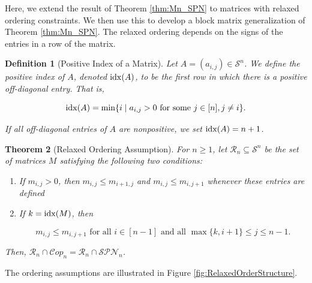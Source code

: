 \documentclass{amsart}
\def\idx{{\rm idx}}
\newcommand{\cR}{\mathcal{R}}
\newcommand{\cS}{\mathcal{S}}
\newcommand{\Cop}{\mathcal{C}op}
\newcommand{\SPN}{\mathcal{SPN}}
\newtheorem{theorem}{Theorem}[section]
\newtheorem{definition}[theorem]{Definition}
\theoremstyle{definition}
\begin{document}
Here, we extend the result of Theorem \ref{thm:Mn_SPN} to matrices with relaxed ordering constraints. We then use this to develop a block matrix generalization of Theorem \ref{thm:Mn_SPN}. The relaxed ordering depends on the signs of the entries in a row of the matrix. 

\begin{definition}[Positive Index of a Matrix]\label{def:idx}
Let $A = (a_{i,j}) \in \cS^n$. We define the positive index of $A$, denoted $\idx(A)$, to be the first row in which there is a positive off-diagonal entry. That is,  

\[\idx(A) = \min\{i\; \vert \; a_{i,j} > 0\text{ for some } j \in [n], j\neq i\}.\]

If all off-diagonal entries of $A$ are nonpositive, we set $\idx(A) = n+1$. 
\end{definition}

\begin{theorem}[Relaxed Ordering Assumption]\label{thm:RelaxedOrdering}
For $n\geq 1$, let $\cR_n \subseteq \cS^n$ be the set of matrices $M$ satisfying the following two conditions: %

\begin{enumerate}[label = (\ref{thm:RelaxedOrdering}.\Roman*), ref = (\ref{thm:RelaxedOrdering}.\Roman*)]
    \item\label{itm:RelaxedPositive} If $m_{i,j} > 0$, then $m_{i,j}\leq m_{i+1,j}$ and $m_{i,j}\leq m_{i,j+1}$ whenever these entries are defined
    \item\label{itm:RelaxedRowOrdered} If $k = \idx(M)$, then 

    \[m_{i,j} \leq m_{i,j+1} \text{ for all $i \in [n-1]$ and all } \max\{k,i+1\} \leq j \leq n-1.\]
\end{enumerate}

Then, $\cR_n \cap \Cop_n = \cR_n \cap \SPN_n$.
\end{theorem}

The ordering assumptions are illustrated in Figure \ref{fig:RelaxedOrderStructure}.
\end{document}
